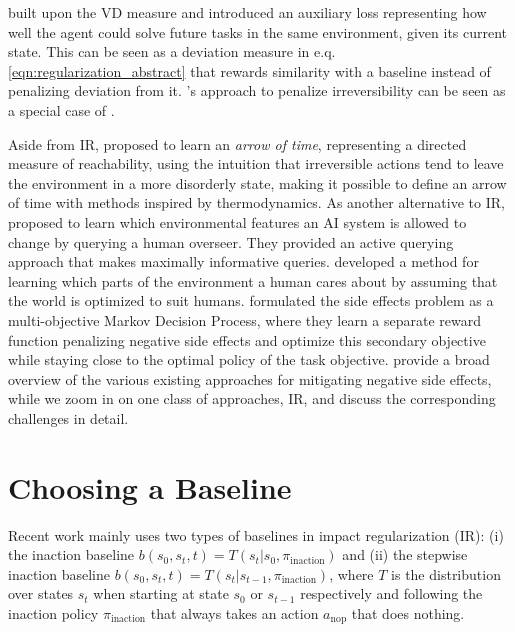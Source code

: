 \documentclass[letterpaper]{article} %
\begin{document}
\citet{krakovna2020avoiding} built upon the VD measure and introduced an auxiliary loss representing how well the agent could solve future tasks in the same environment, given its current state. This can be seen as a deviation measure in e.q. \eqref{eqn:regularization_abstract} that rewards similarity with a baseline instead of penalizing deviation from it. \citet{eysenbach2017leave}'s approach to penalize irreversibility can be seen as a special case of \citet{krakovna2020avoiding}.

Aside from IR, \citet{rahaman2019learning} proposed to learn an \textit{arrow of time}, representing a directed measure of reachability, using the intuition that irreversible actions tend to leave the environment in a more disorderly state, making it possible to define an arrow of time with methods inspired by thermodynamics. As another alternative to IR, \citet{zhang2018minimax, zhang2020querying} proposed to learn which environmental features an AI system is allowed to change by querying a human overseer. They provided an active querying approach that makes maximally informative queries. \citet{Shah2018} developed a method for learning which parts of the environment a human cares about by assuming that the world is optimized to suit humans. \citet{saisubramanian2020multi} formulated the side effects problem as a multi-objective Markov Decision Process, where they learn a separate reward function penalizing negative side effects and optimize this secondary objective while staying close to the optimal policy of the task objective. \citet{saisubramanian2020avoiding} provide a broad overview of the various existing approaches for mitigating negative side effects, while we zoom in on one class of approaches, IR, and discuss the corresponding challenges in detail.

\section{Choosing a Baseline}
\label{sec:defining_baseline}
Recent work mainly uses two types of baselines in impact regularization (IR): (i) the inaction baseline $b(s_0, s_t, t) = T(s_t | s_0, \pi_{\mathrm{inaction}})$ and (ii) the stepwise inaction baseline $b(s_0, s_t, t) = T(s_t | s_{t-1}, \pi_{\mathrm{inaction}})$, where $T$ is the distribution over states $s_t$ when starting at state $s_0$ or $s_{t-1}$ respectively and following the inaction policy $\pi_{\mathrm{inaction}}$  that always takes an action $a_{\mathrm{nop}}$ that does nothing.
\end{document}
